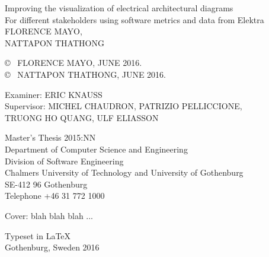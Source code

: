 \vspace*{3.5cm}
Improving the visualization of electrical architectural diagrams\\
For different stakeholders using software metrics and data from Elektra\\[0.2cm]
FLORENCE MAYO, \\
NATTAPON THATHONG \setlength{\parskip}{1cm}

\copyright ~ FLORENCE MAYO, JUNE 2016. \\
\copyright ~ NATTAPON THATHONG, JUNE 2016.\setlength{\parskip}{1cm}

Examiner: ERIC KNAUSS \\
Supervisor: MICHEL CHAUDRON, PATRIZIO PELLICCIONE, \\ TRUONG HO QUANG, ULF ELIASSON
\setlength{\parskip}{1cm}

Master's Thesis 2015:NN\\	%
Department of Computer Science and Engineering\\
Division of Software Engineering\\
Chalmers University of Technology and University of Gothenburg\\
SE-412 96 Gothenburg\\
Telephone +46 31 772 1000 \setlength{\parskip}{0.5cm}

\vfill
Cover: blah blah blah ... \todo{[to be filled in]} \setlength{\parskip}{0.5cm}

Typeset in \LaTeX \\
Gothenburg, Sweden 2016

